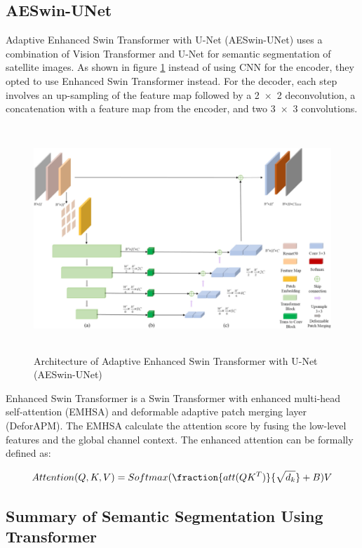 \subsection{AESwin-UNet}
Adaptive Enhanced Swin Transformer with U-Net (AESwin-UNet) \cite{unet-transformer}  uses a combination of Vision Transformer and U-Net for semantic segmentation of satellite images. As shown in figure \ref{fig:unetswin} instead of using CNN for the encoder, they opted to use Enhanced Swin Transformer instead.  For the decoder, each step involves an up-sampling of the feature map followed by a 2 × 2 deconvolution, a concatenation with a feature map from the encoder, and two 3 × 3 convolutions. 

\FloatBarrier
\begin{figure}[ht]
\includegraphics[width=12.5cm, height=8.5cm]{images/unet-trasnformer.jpg}
\centering
\caption{Architecture of Adaptive Enhanced Swin Transformer with U-Net (AESwin-UNet) \protect\cite{unet-transformer}}
\label{fig:unetswin}
\end{figure}

Enhanced Swin Transformer is a Swin Transformer  with enhanced multi-head self-attention (EMHSA) and deformable adaptive patch merging layer (DeforAPM). The EMHSA calculate  the attention score by fusing the low-level features and the global channel context. The enhanced attention can be formally defined as:

\begin{equation}
    Attention(Q,K,V) = Softmax(\fraction{att(QK^T)}{\sqrt{d_k}}+B)V
\end{equation}

\subsection{Summary of Semantic Segmentation Using Transformer}

